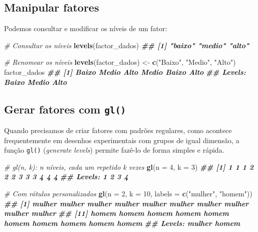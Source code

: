 \documentclass[
  portuguese,
  11pt,
  openany]{book}
\newenvironment{Shaded}{\begin{snugshade}}{\end{snugshade}}
\newcommand{\AttributeTok}[1]{\textcolor[rgb]{0.13,0.29,0.53}{#1}}
\newcommand{\CommentTok}[1]{\textcolor[rgb]{0.56,0.35,0.01}{\textit{#1}}}
\newcommand{\DecValTok}[1]{\textcolor[rgb]{0.00,0.00,0.81}{#1}}
\newcommand{\DocumentationTok}[1]{\textcolor[rgb]{0.56,0.35,0.01}{\textbf{\textit{#1}}}}
\newcommand{\FunctionTok}[1]{\textcolor[rgb]{0.13,0.29,0.53}{\textbf{#1}}}
\newcommand{\NormalTok}[1]{#1}
\newcommand{\OtherTok}[1]{\textcolor[rgb]{0.56,0.35,0.01}{#1}}
\newcommand{\StringTok}[1]{\textcolor[rgb]{0.31,0.60,0.02}{#1}}
\begin{document}
\subsection{Manipular fatores}\label{manipular-fatores}

Podemos consultar e modificar os níveis de um fator:

\begin{Shaded}
\begin{Highlighting}[]
\CommentTok{\# Consultar os níveis}
\FunctionTok{levels}\NormalTok{(factor\_dados)}
\DocumentationTok{\#\# [1] "baixo" "medio" "alto"}

\CommentTok{\# Renomear os níveis}
\FunctionTok{levels}\NormalTok{(factor\_dados) }\OtherTok{\textless{}{-}} \FunctionTok{c}\NormalTok{(}\StringTok{"Baixo"}\NormalTok{, }\StringTok{"Medio"}\NormalTok{, }\StringTok{"Alto"}\NormalTok{)}
\NormalTok{factor\_dados}
\DocumentationTok{\#\# [1] Baixo Medio Alto  Medio Baixo Alto }
\DocumentationTok{\#\# Levels: Baixo Medio Alto}
\end{Highlighting}
\end{Shaded}

\subsection{\texorpdfstring{Gerar fatores com \texttt{gl()}}{Gerar fatores com gl()}}\label{gerar-fatores-com-gl}

Quando precisamos de criar fatores com padrões regulares, como acontece frequentemente em desenhos experimentais com grupos de igual dimensão, a função \texttt{gl()} (\emph{generate levels}) permite fazê-lo de forma simples e rápida.

\begin{Shaded}
\begin{Highlighting}[]
\CommentTok{\# gl(n, k): n níveis, cada um repetido k vezes}
\FunctionTok{gl}\NormalTok{(}\AttributeTok{n =} \DecValTok{4}\NormalTok{, }\AttributeTok{k =} \DecValTok{3}\NormalTok{)}
\DocumentationTok{\#\#  [1] 1 1 1 2 2 2 3 3 3 4 4 4}
\DocumentationTok{\#\# Levels: 1 2 3 4}

\CommentTok{\# Com rótulos personalizados}
\FunctionTok{gl}\NormalTok{(}\AttributeTok{n =} \DecValTok{2}\NormalTok{, }\AttributeTok{k =} \DecValTok{10}\NormalTok{, }\AttributeTok{labels =} \FunctionTok{c}\NormalTok{(}\StringTok{"mulher"}\NormalTok{, }\StringTok{"homem"}\NormalTok{))}
\DocumentationTok{\#\#  [1] mulher mulher mulher mulher mulher mulher mulher mulher mulher mulher}
\DocumentationTok{\#\# [11] homem  homem  homem  homem  homem  homem  homem  homem  homem  homem }
\DocumentationTok{\#\# Levels: mulher homem}
\end{Highlighting}
\end{Shaded}
\end{document}

